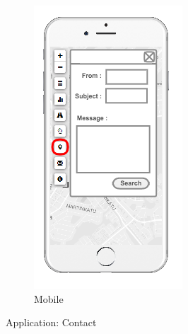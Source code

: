 \begin{figure}[ht]
\begin{subfigure}[b]{0.2\textwidth}
        \includegraphics[width=\textwidth]
          {img/c02-application/png/mobile-basemap-contact.png}
        \caption{Mobile}
    \end{subfigure}
    \caption{Application: Contact}
\end{figure}


